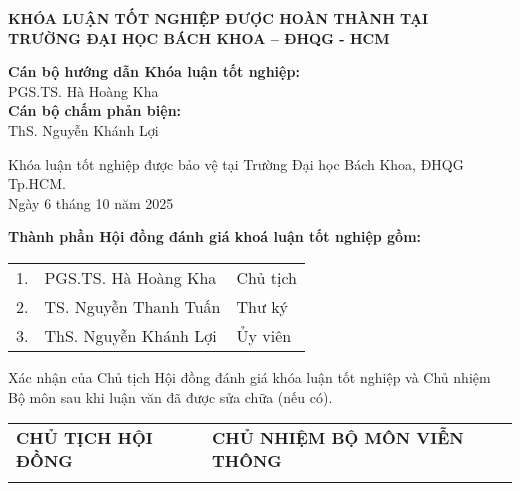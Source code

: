 
\begin{center}
    \textbf{\large KHÓA LUẬN TỐT NGHIỆP ĐƯỢC HOÀN THÀNH TẠI}\\
    \textbf{\large TRƯỜNG ĐẠI HỌC BÁCH KHOA – ĐHQG - HCM}
\end{center}

\vspace{1cm}

\noindent
\textbf{Cán bộ hướng dẫn Khóa luận tốt nghiệp:}\\[0.25cm]
\hspace*{1cm}PGS.TS. Hà Hoàng Kha\\[0.8cm]

\noindent
\textbf{Cán bộ chấm phản biện:}\\[0.25cm]
\hspace*{1cm}ThS. Nguyễn Khánh Lợi\\[1cm]

\vspace{0.4cm}

\noindent
Khóa luận tốt nghiệp được bảo vệ tại Trường Đại học Bách Khoa, ĐHQG Tp.HCM.\\[0.3cm]
\hfill Ngày 6 tháng 10 năm 2025

\vspace{1cm}

\noindent
\textbf{Thành phần Hội đồng đánh giá khoá luận tốt nghiệp gồm:}\\[0.4cm]

\begin{center}
\begin{tabular}{p{0.5cm}p{7cm}p{4cm}}
1. & PGS.TS. Hà Hoàng Kha & Chủ tịch\\[0.3cm]
2. & TS. Nguyễn Thanh Tuấn & Thư ký\\[0.3cm]
3. & ThS. Nguyễn Khánh Lợi & Ủy viên\\
\end{tabular}
\end{center}

\vspace{1cm}

\noindent
Xác nhận của Chủ tịch Hội đồng đánh giá khóa luận tốt nghiệp và Chủ nhiệm Bộ môn sau khi luận văn đã được sửa chữa (nếu có).\\[0.8cm]

\begin{center}
\begin{tabular}{p{7cm}p{8cm}}
\centering \textbf{CHỦ TỊCH HỘI ĐỒNG} & \centering \textbf{CHỦ NHIỆM BỘ MÔN VIỄN THÔNG}\\[2cm]
\centering \vspace*{0cm} & \\
\end{tabular}
\end{center}
